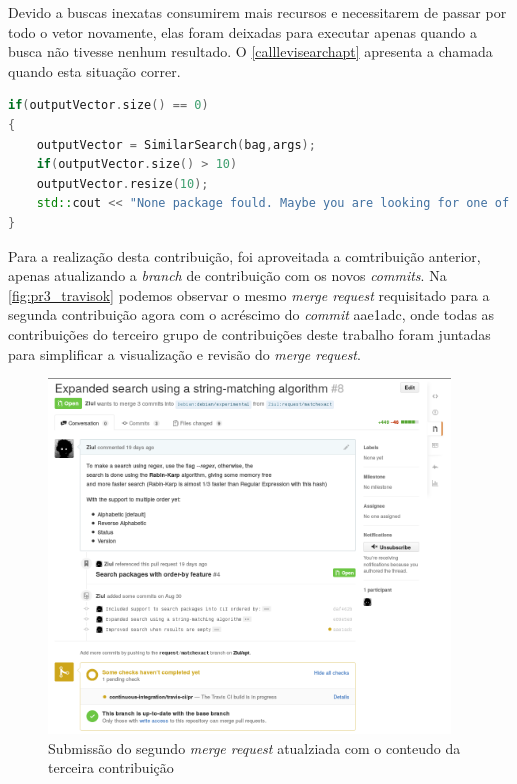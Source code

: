 Devido a buscas inexatas consumirem mais recursos e necessitarem de passar por todo o vetor novamente, elas foram deixadas para executar apenas quando a busca não tivesse nenhum resultado. O \autoref{calllevisearchapt} apresenta a chamada quando esta situação correr.

\begin{lstlisting}[language=C++,label=calllevisearchapt,caption={Chamada seletiva para buscas inexatas}]
if(outputVector.size() == 0)
{
	outputVector = SimilarSearch(bag,args);
	if(outputVector.size() > 10)
	outputVector.resize(10);
	std::cout << "None package fould. Maybe you are looking for one of those:" << std::endl;
}
\end{lstlisting}


Para a realização desta contribuição, foi aproveitada a comtribuição anterior, apenas atualizando a \textit{branch} de contribuição com os novos \textit{commits}. Na \autoref{fig:pr3_travisok} podemos observar o mesmo \textit{merge request} requisitado para a segunda contribuição agora com o acréscimo do \textit{commit} {\code aae1adc}, onde todas as contribuições do terceiro grupo de contribuições deste trabalho foram juntadas para simplificar a visualização e revisão do \textit{merge request}.

\begin{figure}[h]
  \centering
	\includegraphics[width=0.95\textwidth]{figuras/pr3}
  \caption{Submissão do segundo \textit{merge request} atualziada com o conteudo da terceira contribuição}
  \label{fig:pr3_travisok}
\end{figure}
